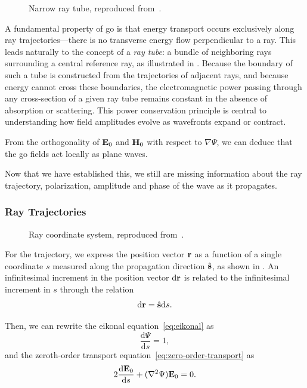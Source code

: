 \begin{figure}
  \centering
  \caption{Narrow ray tube, reproduced from~\cite[Fig.~2.2]{McNamara1990}.}
\end{figure}

A fundamental property of \gls{go} is that energy transport occurs exclusively along ray trajectories---there is no transverse energy flow perpendicular to a ray. This leads naturally to the concept of a \emph{ray tube}: a bundle of neighboring rays surrounding a central reference ray, as illustrated in . Because the boundary of such a tube is constructed from the trajectories of adjacent rays, and because energy cannot cross these boundaries, the electromagnetic power passing through any cross-section of a given ray tube remains constant in the absence of absorption or scattering. This power conservation principle is central to understanding how field amplitudes evolve as wavefronts expand or contract.

From the orthogonality of $\mathbf{E}_0$ and $\mathbf{H}_0$ with respect to $\nabla \Psi$, we can deduce that the \gls{go} fields act locally as plane waves.

Now that we have established this, we still are missing information about the ray trajectory, polarization, amplitude and phase of the wave as it propagates.

\subsubsection{Ray Trajectories}

\begin{figure}
  \centering
  \caption{Ray coordinate system, reproduced from~\cite[Fig.~2.3]{McNamara1990}.}
\end{figure}

For the trajectory, we express the position vector $\mathbf{r}$ as a function of a single coordinate $s$ measured along the propagation direction $\hat{\mathbf{s}}$, as shown in . An infinitesimal increment in the position vector $\mathrm{d}\mathbf{r}$ is related to the infinitesimal increment in $s$ through the relation
\begin{equation}
  \mathrm{d}\mathbf{r} = \hat{\mathbf{s}}\mathrm{d}s.
\end{equation}

Then, we can rewrite the eikonal equation~\eqref{eq:eikonal} as
\begin{equation}
  \frac{\mathrm{d}\Psi}{\mathrm{d}s} = 1,
\end{equation}
and the zeroth-order transport equation~\eqref{eq:zero-order-transport} as
\begin{equation}
  2 \frac{\mathrm{d}\mathbf{E}_0}{\mathrm{d}s} + (\nabla^2\Psi) \mathbf{E}_0 = 0.
\end{equation}


